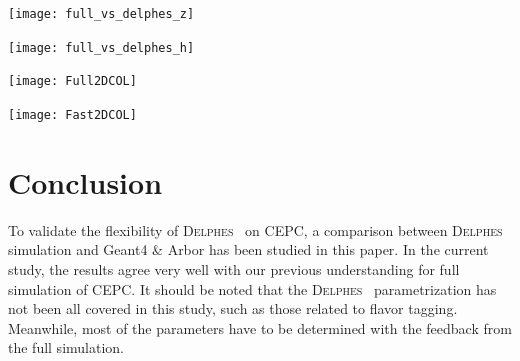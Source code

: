 \documentclass[a4paper,10pt,twoside]{cpc-hepnp}
\begin{document}
\begin{center}
\texttt{[image: full\_vs\_delphes\_z]}
\end{center}
\begin{center}
\texttt{[image: full\_vs\_delphes\_h]}
\end{center}


\begin{center}
\texttt{[image: Full2DCOL]}
\end{center}
\begin{center}
\texttt{[image: Fast2DCOL]}
\end{center}

\section{Conclusion\label{sec:conclusion}}
To validate the flexibility of {\textsc{Delphes}~} on CEPC, a comparison between {\textsc{Delphes}~} simulation and Geant4 \& Arbor has been studied in this paper. In the current study, the results agree very well with our previous understanding for full simulation of CEPC. It should be noted that the {\textsc{Delphes}~} parametrization has not been all covered in this study, such as those related to flavor tagging. Meanwhile, most of the parameters have to be determined with the feedback from the full simulation.
\vspace{3mm}
\end{document}

